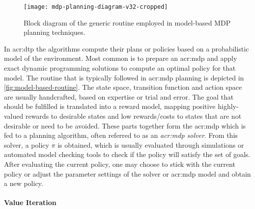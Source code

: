 \begin{figure}[!t]
	\centering
	\texttt{[image: mdp-planning-diagram-v32-cropped]}
	\caption{Block diagram of the generic routine employed in model-based MDP planning techniques.}
	\label{fig:model-based-routine}
\end{figure}

In \acrshort{acr:dtp} the algorithms compute their plans or policies based on a probabilistic model of the environment.
Most common is to prepare an \acrshort{acr:mdp} and apply exact dynamic programming solutions to compute an optimal policy for that model.
The routine that is typically followed in \acrshort{acr:mdp} planning is depicted in \autoref{fig:model-based-routine}.
The state space, transition function and action space are usually handcrafted, based on expertise or trial and error.
The goal that should be fulfilled is translated into a reward model, mapping positive highly-valued rewards to desirable states and low rewards/costs to states that are not desirable or need to be avoided.
These parts together form the \acrshort{acr:mdp} which is fed to a planning algorithm, often referred to as an \textit{\acrshort{acr:mdp} solver}.
From this solver, a policy $\pi$ is obtained, which is usually evaluated through simulations or automated model checking tools to check if the policy will satisfy the set of goals.
After evaluating the current policy, one may choose to stick with the current policy or adjust the parameter settings of the solver or \acrshort{acr:mdp} model and obtain a new policy.


\paragraph{Value Iteration}
\label{sec:value-iteration}

